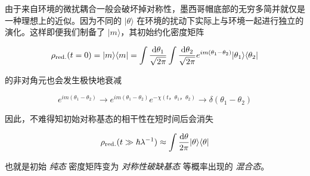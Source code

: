 由于来自环境的微扰耦合一般会破坏掉对称性，墨西哥帽底部的无穷多简并就仅是一种理想上的近似。因为不同的 $|\theta\rangle$ 在环境的扰动下实际上与环境一起进行独立的演化。这样即便我们制备了 $|m\rangle$，其初始约化密度矩阵

\begin{equation}
    \rho_{\mathrm{red.}}(t=0) = |m\rangle \langle m| = \int \frac{\mathop{}\!\mathrm{d} \theta_1}{\sqrt{2\pi}} \int \frac{\mathop{}\!\mathrm{d} \theta_2}{\sqrt{2\pi}} e^{im(\theta_1-\theta_2)} |\theta_1\rangle \langle\theta_2|
    \label{equ:2}
\end{equation}

的非对角元也会发生极快地衰减

\begin{equation}
    e^{im(\theta_1-\theta_2)} \to e^{im(\theta_1-\theta_2)} e^{-\chi(t，\theta_1，\theta_2)} \to \delta(\theta_1 -\theta_2)
    \label{equ:3}
\end{equation}

因此，不难得知初始对称基态的相干性在短时间后会消失

\begin{equation}
    \rho_{\mathrm{red.}}(t \gg \hbar \lambda^{-1}) \approx \int \frac{\mathop{}\!\mathrm{d} \theta}{2\pi} |\theta\rangle \langle\theta|
    \label{equ:4}
\end{equation}

也就是初始 \emph{纯态} 密度矩阵变为 \emph{对称性破缺基态} 等概率出现的 \emph{混合态}。
